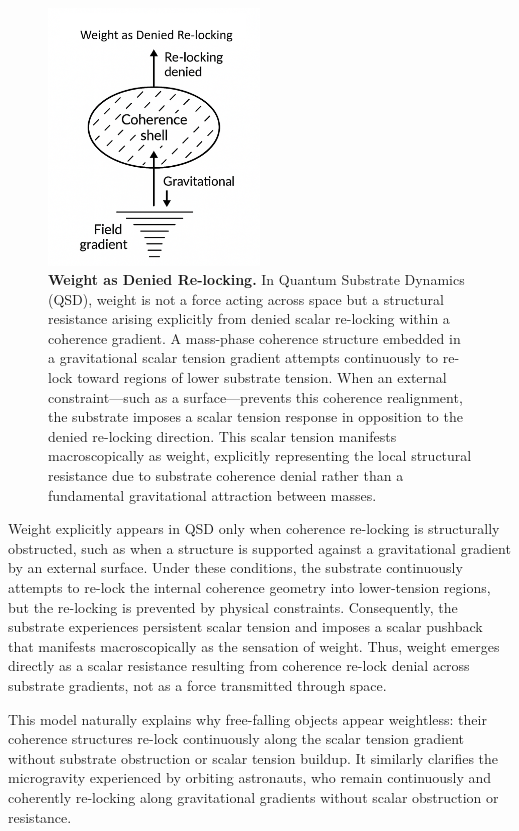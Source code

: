 \documentclass[preprints,article,submit,pdftex,moreauthors]{Definitions/mdpi}
\begin{document}
\begin{figure}[H]
    \centering
    \includegraphics[width=0.5\textwidth]{figures/weight.png}
    \caption{
    \textbf{Weight as Denied Re-locking.}
    In Quantum Substrate Dynamics (QSD), weight is not a force acting across space but a structural resistance arising explicitly from denied scalar re-locking within a coherence gradient. A mass-phase coherence structure embedded in a gravitational scalar tension gradient attempts continuously to re-lock toward regions of lower substrate tension. When an external constraint—such as a surface—prevents this coherence realignment, the substrate imposes a scalar tension response in opposition to the denied re-locking direction. This scalar tension manifests macroscopically as weight, explicitly representing the local structural resistance due to substrate coherence denial rather than a fundamental gravitational attraction between masses.
    }
    \label{fig:weight-denied-relock}
\end{figure}

Weight explicitly appears in QSD only when coherence re-locking is structurally obstructed, such as when a structure is supported against a gravitational gradient by an external surface. Under these conditions, the substrate continuously attempts to re-lock the internal coherence geometry into lower-tension regions, but the re-locking is prevented by physical constraints. Consequently, the substrate experiences persistent scalar tension and imposes a scalar pushback that manifests macroscopically as the sensation of weight. Thus, weight emerges directly as a scalar resistance resulting from coherence re-lock denial across substrate gradients, not as a force transmitted through space.

This model naturally explains why free-falling objects appear weightless: their coherence structures re-lock continuously along the scalar tension gradient without substrate obstruction or scalar tension buildup. It similarly clarifies the microgravity experienced by orbiting astronauts, who remain continuously and coherently re-locking along gravitational gradients without scalar obstruction or resistance.
\end{document}
